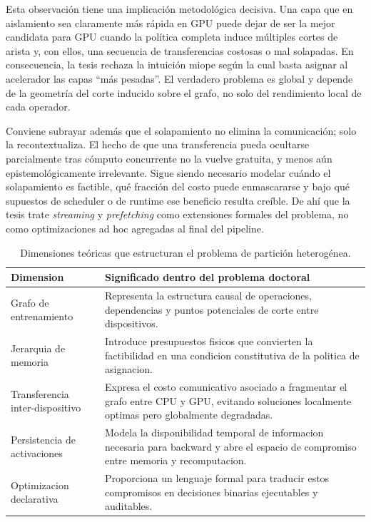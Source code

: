 Esta observación tiene una implicación metodológica decisiva. Una capa que en aislamiento sea claramente más rápida en GPU puede dejar de ser la mejor candidata para GPU cuando la política completa induce múltiples cortes de arista y, con ellos, una secuencia de transferencias costosas o mal solapadas. En consecuencia, la tesis rechaza la intuición miope según la cual basta asignar al acelerador las capas ``más pesadas''. El verdadero problema es global y depende de la geometría del corte inducido sobre el grafo, no solo del rendimiento local de cada operador.

Conviene subrayar además que el solapamiento no elimina la comunicación; solo la recontextualiza. El hecho de que una transferencia pueda ocultarse parcialmente tras cómputo concurrente no la vuelve gratuita, y menos aún epistemológicamente irrelevante. Sigue siendo necesario modelar cuándo el solapamiento es factible, qué fracción del costo puede enmascararse y bajo qué supuestos de scheduler o de runtime ese beneficio resulta creíble. De ahí que la tesis trate \textit{streaming} y \textit{prefetching} como extensiones formales del problema, no como optimizaciones ad hoc agregadas al final del pipeline.

\begin{table}[t]
\centering
\caption{Dimensiones teóricas que estructuran el problema de partición heterogénea.}
\label{tab:theoretical-dimensions}
\small
\begin{tabularx}{\textwidth}{lX}
\toprule
Dimension & Significado dentro del problema doctoral \\
\midrule
Grafo de entrenamiento & Representa la estructura causal de operaciones, dependencias y puntos potenciales de corte entre dispositivos. \\
Jerarquia de memoria & Introduce presupuestos fisicos que convierten la factibilidad en una condicion constitutiva de la politica de asignacion. \\
Transferencia inter-dispositivo & Expresa el costo comunicativo asociado a fragmentar el grafo entre CPU y GPU, evitando soluciones localmente optimas pero globalmente degradadas. \\
Persistencia de activaciones & Modela la disponibilidad temporal de informacion necesaria para backward y abre el espacio de compromiso entre memoria y recomputacion. \\
Optimizacion declarativa & Proporciona un lenguaje formal para traducir estos compromisos en decisiones binarias ejecutables y auditables. \\
\bottomrule
\end{tabularx}
\normalsize
\end{table}

